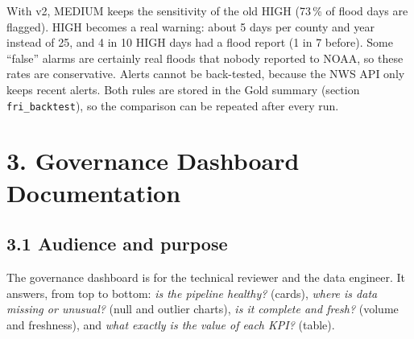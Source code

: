 \documentclass[stu, 12pt, letterpaper, donotrepeattitle, floatsintext, natbib]{apa7}
\begin{document}
\noindent With v2, MEDIUM keeps the sensitivity of the old HIGH (73\,\% of flood days are flagged). HIGH becomes a real warning: about 5 days per county and year instead of 25, and 4 in 10 HIGH days had a flood report (1 in 7 before). Some ``false'' alarms are certainly real floods that nobody reported to NOAA, so these rates are conservative. Alerts cannot be back-tested, because the NWS API only keeps recent alerts. Both rules are stored in the Gold summary (section \texttt{fri\_backtest}), so the comparison can be repeated after every run.

\section{\large 3. Governance Dashboard Documentation}
\subsection{3.1 Audience and purpose}
The governance dashboard is for the technical reviewer and the data engineer. It answers, from top to bottom: \emph{is the pipeline healthy?} (cards), \emph{where is data missing or unusual?} (null and outlier charts), \emph{is it complete and fresh?} (volume and freshness), and \emph{what exactly is the value of each KPI?} (table).
\end{document}
